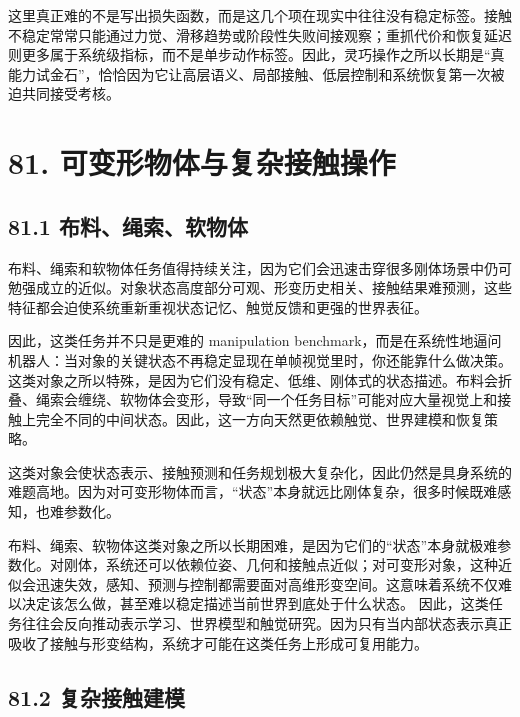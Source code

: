 这里真正难的不是写出损失函数，而是这几个项在现实中往往没有稳定标签。接触不稳定常常只能通过力觉、滑移趋势或阶段性失败间接观察；重抓代价和恢复延迟则更多属于系统级指标，而不是单步动作标签。因此，灵巧操作之所以长期是“真能力试金石”，恰恰因为它让高层语义、局部接触、低层控制和系统恢复第一次被迫共同接受考核。

\chapter*{81. 可变形物体与复杂接触操作}

\section*{81.1 布料、绳索、软物体}


布料、绳索和软物体任务值得持续关注，因为它们会迅速击穿很多刚体场景中仍可勉强成立的近似。对象状态高度部分可观、形变历史相关、接触结果难预测，这些特征都会迫使系统重新重视状态记忆、触觉反馈和更强的世界表征。

因此，这类任务并不只是更难的 manipulation benchmark，而是在系统性地逼问机器人：当对象的关键状态不再稳定显现在单帧视觉里时，你还能靠什么做决策。 这类对象之所以特殊，是因为它们没有稳定、低维、刚体式的状态描述。布料会折叠、绳索会缠绕、软物体会变形，导致“同一个任务目标”可能对应大量视觉上和接触上完全不同的中间状态。因此，这一方向天然更依赖触觉、世界建模和恢复策略。

这类对象会使状态表示、接触预测和任务规划极大复杂化，因此仍然是具身系统的难题高地。因为对可变形物体而言，“状态”本身就远比刚体复杂，很多时候既难感知，也难参数化。

布料、绳索、软物体这类对象之所以长期困难，是因为它们的“状态”本身就极难参数化。对刚体，系统还可以依赖位姿、几何和接触点近似；对可变形对象，这种近似会迅速失效，感知、预测与控制都需要面对高维形变空间。这意味着系统不仅难以决定该怎么做，甚至难以稳定描述当前世界到底处于什么状态。 因此，这类任务往往会反向推动表示学习、世界模型和触觉研究。因为只有当内部状态表示真正吸收了接触与形变结构，系统才可能在这类任务上形成可复用能力。

\section*{81.2 复杂接触建模}


